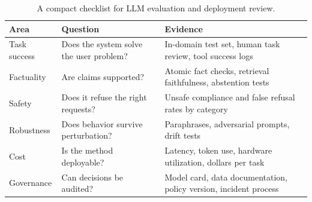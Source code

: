 \begin{table}[t]
\centering
\begin{tabular}{p{}p{}p{}}
\toprule
Area & Question & Evidence \\
\midrule
Task success & Does the system solve the user problem? & In-domain test set, human task review, tool success logs \\
Factuality & Are claims supported? & Atomic fact checks, retrieval faithfulness, abstention tests \\
Safety & Does it refuse the right requests? & Unsafe compliance and false refusal rates by category \\
Robustness & Does behavior survive perturbation? & Paraphrases, adversarial prompts, drift tests \\
Cost & Is the method deployable? & Latency, token use, hardware utilization, dollars per task \\
Governance & Can decisions be audited? & Model card, data documentation, policy version, incident process \\
\bottomrule
\end{tabular}
\caption{A compact checklist for LLM evaluation and deployment review.}
\label{tab:evaluation-checklist}
\end{table}

